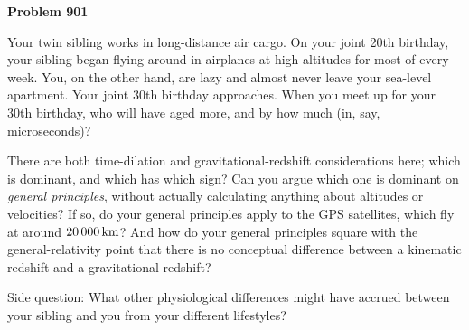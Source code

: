 \documentclass[12pt]{article}
\begin{document}
\begin{pottproblem}
\textbf{Problem 901}

Your twin sibling works in long-distance air cargo.
On your joint 20th birthday, your sibling began 
flying around in airplanes at high altitudes for most of every week.
You, on the other hand, are lazy and almost never leave your sea-level apartment.
Your joint 30th birthday approaches.
When you meet up for your 30th birthday, who will have aged more, and
by how much (in, say, microseconds)?

There are both time-dilation and gravitational-redshift considerations here;
which is dominant, and which has which sign?
Can you argue which one is dominant on \emph{general principles},
without actually calculating anything about altitudes or velocities?
If so, do your general principles apply to the GPS satellites, which fly at
around $20\,000\,\mathrm{km}$?
And how do your general principles square with the general-relativity point
that there is no conceptual difference between a kinematic redshift and a
gravitational redshift?

Side question:
What other physiological differences might have accrued between your sibling
and you from your different lifestyles?

\end{pottproblem}
\end{document}
